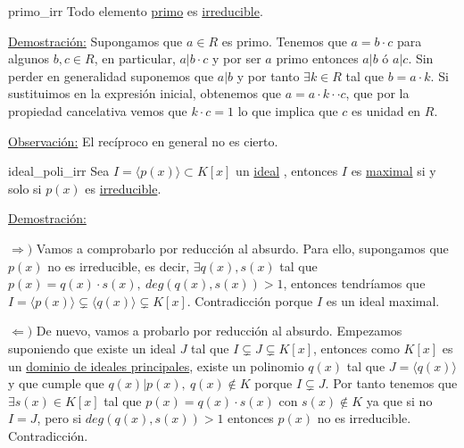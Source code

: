 \documentclass[10pt, a4paper]{article}
\newcommand{\obs}{\underline{Observación:} }
\newcommand{\demo}{\underline{Demostración:} }
\newcommand{\ideal}[1][]{\hyperref[def:ideal]{ideal}#1 }
\begin{document}
\begin{proposition}{}{primo_irr}
Todo elemento \hyperref[def:ele_primo]{primo} es \hyperref[def:ele_irr]{irreducible}.
\end{proposition}

\demo Supongamos que $a \in R$ es primo. Tenemos que $a = b \cdot c$ para algunos $b,c \in R$, en particular, $a | b \cdot c$ y por ser $a$ primo entonces $a | b$ ó $a | c$. Sin perder en generalidad suponemos que $a | b$ y por tanto $\exists k \in R$ tal que $b = a \cdot k$. Si sustituimos en la expresión inicial, obtenemos que $a = a \cdot k \cdot \cdot c$, que por la propiedad cancelativa vemos que $k \cdot c = 1$ lo que implica que $c$ es unidad en $R$.

\vspace{3mm}

\obs El recíproco en general no es cierto.

\begin{theorem}{}{ideal_poli_irr}
Sea $I = \langle p(x)\rangle \subset K[x]$ un \ideal, entonces $I$ es \hyperref[def:ideal_maximal]{maximal} si y solo si $p(x)$ es \hyperref[def:ele_irr]{irreducible}.
\end{theorem}

\demo 

$\Longrightarrow )$ Vamos a comprobarlo por reducción al absurdo. Para ello, supongamos que $p(x)$ no es irreducible, es decir, $\exists q(x), s(x)$ tal que $p(x) = q(x) \cdot s(x),\ deg(q(x), s(x)) > 1$, entonces tendríamos que $I = \langle p(x) \rangle \subsetneq \langle q(x) \rangle \subsetneq K[x]$. Contradicción porque $I$ es un ideal maximal.

$\Longleftarrow )$ De nuevo, vamos a probarlo por reducción al absurdo. Empezamos suponiendo que existe un ideal $J$ tal que $I \subsetneq J \subsetneq K[x]$, entonces como $K[x]$ es un \hyperref[def:DIP]{dominio de ideales principales}, existe un polinomio $q(x)$ tal que $J = \langle q(x) \rangle$ y que cumple que $q(x) | p(x),\ q(x) \notin K$ porque $I \subsetneq J$. Por tanto tenemos que $\exists s(x) \in K[x]$ tal que $p(x) = q(x) \cdot s(x)$ con $s(x) \notin K$ ya que si no $I = J$, pero si $deg(q(x), s(x)) > 1$ entonces $p(x)$ no es irreducible. Contradicción.
\end{document}
